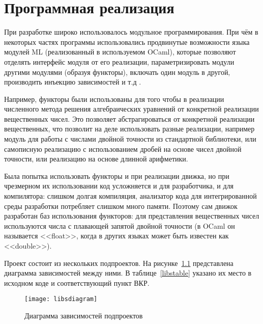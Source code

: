 \chapter{Программная реализация}

При разработке широко использовалось модульное программирования. При чём в некоторых частях программы использовались
продвинутые возможности языка модулей ML (реализованный в используемом OCaml), которые позволяют
отделять интерфейс модуля от его реализации,
параметризировать модули другими модулями (образуя функторы),
включать один модуль в другой, \cite{wiki-mlmodules}
производить инъекцию зависимостей и т.д \cite{functor-driven}.

Например, функторы были использованы для того чтобы в реализации численного метода решения алгебраических уравнений
от конкретной реализации вещественных чисел. Это позволяет абстрагироваться от конкретной реализации вещественных,
что позволит на деле использовать разные реализации, например модуль для работы с числами двойной точности из стандартной библиотеки,
или самописную реализацию с использованием дробей на основе чисел двойной точности, или реализацию на основе длинной арифметики.

Была попытка использовать функторы и при реализации движка, но при чрезмерном их использовании код усложняется и для разработчика,
и для компилятора: слишком долгая компиляция, анализатор кода для интегрированной среды разработки потребляет слишком много памяти.
Поэтому сам движок разработан баз использования функторов: для представления вещественных чисел используются числа
с плавающей запятой двойной точности (в OCaml он называется <<float>>, когда в других языках может быть известен как <<double>>).

Проект состоит из нескольких подпроектов. На рисунке~\ref{libsdiagramfig} представлена диаграмма зависимостей между ними.
В таблице~\ref{libstable} указано их место в исходном коде и соответствующий пункт ВКР.

\begin{figure}[H]
    \centering
    \texttt{[image: libsdiagram]}
    \caption{Диаграмма зависимостей подпроектов\label{libsdiagramfig}}
\end{figure}

